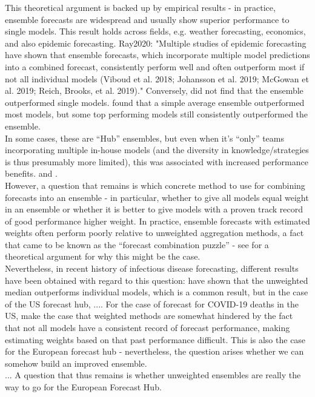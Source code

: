 This theoretical argument is backed up by empirical results - in practice, ensemble forecasts are widespread and usually show superior performance to single models. This result holds across fields, e.g. weather forecasting, economics, and also epidemic forecasting.
Ray2020: "Multiple studies of epidemic forecasting have shown that ensemble forecasts, which incorporate multiple model predictions into a combined forecast, consistently perform well and often outperform most if not all individual models (Viboud et al. 2018; Johansson et al. 2019; McGowan et al. 2019; Reich, Brooks, et al. 2019)." Conversely, \cite{bracher_pre-registered_2021} did not find that the ensemble outperformed single models. \cite{the_influenza_forecasting_working_group_collaborative_2019} found that a simple average ensemble outperformed most models, but some top performing models still consistently outperformed the ensemble.\\
In some cases, these are ``Hub'' ensembles, but even when it's ``only'' teams incorporating multiple in-house models (and the diversity in knowledge/strategies is thus presumably more limited), this was associated with increased performance benefits.\cite{the_influenza_forecasting_working_group_collaborative_2019} and \cite{reich_collaborative_2019}. \\
However, a question that remains is which concrete method to use for combining forecasts into an ensemble - in particular, whether to give all models equal weight in an ensemble or whether it is better to give models with a proven track record of good performance higher weight. In practice, ensemble forecasts with estimated weights often perform poorly relative to unweighted aggregation methods, a fact that came to be known as the ``forecast combination puzzle'' - see \cite{claeskens_forecast_2016} for a theoretical argument for why this might be the case.\\
Nevertheless, in recent history of infectious disease forecasting, different results have been obtained with regard to this question: \cite{sherratt_european_2022} have shown that the unweighted median outperforms individual models, which is a common result, but in the case of the US forecast hub, .... For the case of forecast for COVID-19 deaths in the US, \cite{taylor_combining_2021} make the case that weighted methods are somewhat hindered by the fact that not all models have a consistent record of forecast performance, making estimating weights based on that past performance difficult. This is also the case for the European forecast hub - nevertheless, the question arises whether we can somehow build an improved ensemble.\\
...
A question that thus remains is whether unweighted ensembles are really the way to go for the European Forecast Hub.

